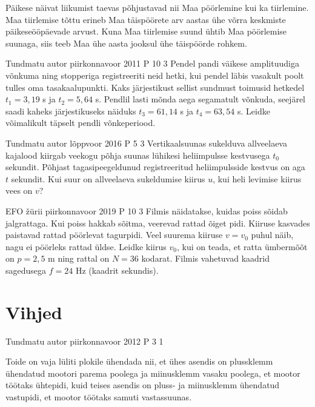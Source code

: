 \documentclass[11pt]{article}
\begin{document}
{{\ifHint
Päikese näivat liikumist taevas põhjustavad nii Maa pöörlemine kui ka tiirlemine. Maa tiirlemise tõttu erineb Maa täispöörete arv aastas ühe võrra keskmiste päikeseööpäevade arvust. Kuna Maa tiirlemise suund ühtib Maa pöörlemise suunaga, siis teeb Maa ühe aasta jooksul ühe täispöörde rohkem.
\fi
}

{Tundmatu autor} %
{piirkonnavoor} %
{2011} %
{P 10} %
{3} %
{
\ifStatement
Pendel pandi väikese amplituudiga võnkuma ning stopperiga registreeriti neid hetki, kui pendel läbis vasakult poolt tulles oma tasakaalupunkti. Kaks järjestikust sellist sundmust toimusid hetkedel  $t_1 = 3,19$ s ja $t_2 =  5,64$ s. Pendlil lasti mõnda aega segamatult võnkuda, seejärel saadi kaheks järjestikuseks näiduks $t_3 =  61,14$ s ja $t_4 =  63,54$ s. Leidke võimalikult täpselt pendli võnkeperiood.
\fi
}

{Tundmatu autor} %
{lõppvoor} %
{2016} %
{P 5} %
{3} %
{
\ifStatement
Vertikaalsuunas sukelduva allveelaeva kajalood kiirgab veekogu põhja suunas lühikesi heliimpulsse kestvusega $t_0$ sekundit. Põhjast tagasipeegeldunud registreeritud heliimpulsside kestvus on aga $t$ sekundit. Kui suur on allveelaeva sukeldumise kiirus $u$, kui heli levimise kiirus vees on $v$?
\fi
}


{EFO žürii} %
{piirkonnavoor} %
{2019} %
{P 10} %
{3} %
{
\ifStatement
Filmis näidatakse, kuidas poiss sõidab jalgrattaga. Kui poiss hakkab sõitma, veerevad rattad õiget pidi. Kiiruse kasvades paistavad rattad pöörlevat tagurpidi. Veel suurema kiiruse $v = v_0$ puhul näib, nagu ei pöörleks rattad üldse. Leidke kiirus $v_0$, kui on teada, et ratta ümbermõõt on $p = 2,5$ m ning rattal on $N = 36$ kodarat. Filmis vahetuvad kaadrid sagedusega $f = 24$ Hz (kaadrit sekundis).
\fi
}
\newpage\normalsize\section{Vihjed}
        \ToggleHint
        
{Tundmatu autor} %
{piirkonnavoor} %
{2012} %
{P 3} %
{1} %
{

\ifHint
Toide on vaja lüliti plokile ühendada nii, et ühes asendis on plussklemm ühendatud mootori parema poolega ja miinusklemm vasaku poolega, et mootor töötaks ühtepidi, kuid teises asendis on pluss- ja miinusklemm ühendatud vastupidi, et mootor töötaks samuti vastassuunas.
\fi
}

}
\end{document}
